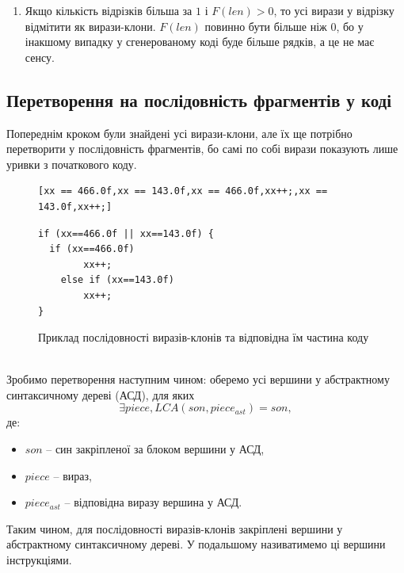\documentclass[a4paper, 14pt]{article}
\begin{document}
\begin{itemize}
{\begin{enumerate}
{де:
\begin{itemize}
\item $len*goodGraphs$ -- приблизна початкова кількість рядків коду;
\item $goodGraphs$ -- кількість потрібних викликів нової функції, кожен виклик зазвичай займає 1 рядок;
\item $2*T*goodGraphs$ -- приблизна кількість рядків коду, потрібного для врахування усіх відмінностей між послідовностями виразів;
\item $len$ -- приблизна кількість рядків коду, що є повністю ідентичним між усіма послідовностями;
\item $2$ -- кількість рядків, необхідна щоб записати функцію у коді.
\end{itemize}
$$F(len) = len*goodGraphs-goodGraphs-2*T*goodGraphs-len-2$$
$$F(len) = (len-1)*goodGraphs-2*T*goodGraphs-len-2$$
$$F(len) = (len-2*T-1)*goodGraphs-len-2$$
}
\item Якщо кількість відрізків більша за $1$ і $F(len)>0$, то усі вирази у відрізку відмітити як вирази-клони.
$F(len)$ повинно бути більше ніж 0, бо у інакшому випадку у сгенерованому коді буде більше рядків, а це не має сенсу.
\end{enumerate}
}
\end{itemize}
\subsection{Перетворення на послідовність фрагментів у коді}
Попереднім кроком були знайдені усі вирази-клони, але їх ще потрібно перетворити у послідовність фрагментів, бо самі по собі вирази показують лише уривки з початкового коду.   
\begin{figure}[h!]
\centering
\begin{minipage}{.5\textwidth}
\begin{lstlisting}[frame=none]
[xx == 466.0f,xx == 143.0f,xx == 466.0f,xx++;,xx == 143.0f,xx++;]
\end{lstlisting}
\end{minipage}
\begin{minipage}{.4\textwidth}
\begin{lstlisting}[frame=none]
if (xx==466.0f || xx==143.0f) {
  if (xx==466.0f)
		xx++;
	else if (xx==143.0f)
		xx++;
}	
\end{lstlisting}
\end{minipage}
\caption{Приклад послідовності виразів-клонів та відповідна їм частина коду}
\end{figure} \\
Зробимо перетворення наступним чином: оберемо усі вершини у абстрактному синтаксичному дереві (АСД), для яких
$$\exists piece, LCA(son, piece_{ast}) = son,$$
де:
\begin{itemize}
\item $son$ -- син закріпленої за блоком вершини у АСД, 
\item $piece$ -- вираз, 
\item $piece_{ast}$ -- відповідна виразу вершина у АСД.
\end{itemize}
Таким чином, для послідовності виразів-клонів закріплені вершини у абстрактному синтаксичному дереві.
У подальшому називатимемо ці вершини інструкціями.
\end{document}
